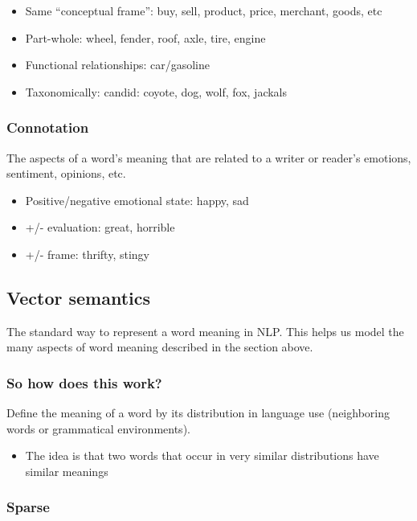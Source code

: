 \documentclass[11pt]{article}
\begin{document}
\begin{itemize}

	\item Same ``conceptual frame'': buy, sell, product, price, merchant, goods,
	      etc
	\item Part-whole: wheel, fender, roof, axle, tire, engine
	\item Functional relationships: car/gasoline
	\item Taxonomically: candid: coyote, dog, wolf, fox, jackals

\end{itemize}

\subsubsection{Connotation}

The aspects of a word's meaning that are related to a writer or reader's
emotions, sentiment, opinions, etc.

\begin{itemize}
	\item Positive/negative emotional state: happy, sad
	\item +/- evaluation: great, horrible
	\item +/- frame: thrifty, stingy

\end{itemize}

\subsection{Vector semantics}

The standard way to represent a word meaning in NLP. This helps us model the
many aspects of word meaning described in the section above.

\subsubsection*{So how does this work?}

Define the meaning of a word by its distribution in language use (neighboring
words or grammatical environments).

\begin{itemize}
	\item The idea is that two words that occur in very similar distributions have
	      similar meanings
\end{itemize}

\subsubsection{Sparse}
\end{document}
